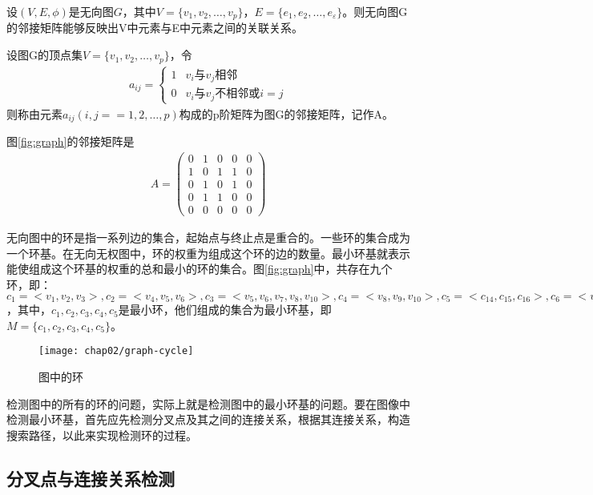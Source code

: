 设$(V, E, \phi)$是无向图$G$，其中$V = \{v_1, v_2, \ldots, v_p\}$，$E = \{e_1, e_2, \ldots, e_\varepsilon\}$。则无向图G的邻接矩阵能够反映出V中元素与E中元素之间的关联关系。
\begin{definition}
设图G的顶点集$V = \{v_1, v_2, \ldots, v_p\}$，令
\begin{align}
a_{ij} = \left\{ \begin{array}{ll}
1 & \textrm{$v_i$与$v_j$相邻}\\
0 & \textrm{$v_i$与$v_j$不相邻或$i = j$}
\end{array} \right.
\end{align}
则称由元素$a_{ij} (i, j == 1, 2, \ldots, p)$构成的p阶矩阵为图G的邻接矩阵\cite{wangzhaorui}，记作A。
\end{definition}
图\ref{fig:graph}的邻接矩阵是
\begin{align}
A = \left( \begin{array}{lllll}
0 & 1 & 0 & 0 & 0 \\
1 & 0 & 1 & 1 & 0 \\
0 & 1 & 0 & 1 & 0 \\
0 & 1 & 1 & 0 & 0 \\
0 & 0 & 0 & 0 & 0 
\end{array} \right)
\end{align}

无向图中的环是指一系列边的集合，起始点与终止点是重合的。一些环的集合成为一个环基。在无向无权图中，环的权重为组成这个环的边的数量。最小环基就表示能使组成这个环基的权重的总和最小的环的集合。图\ref{fig:graph}中，共存在九个环，即：$c_1 = < v_1, v_2, v_3>, c_2 = <v_4, v_5, v_6>, c_3 = <v_5, v_6, v_7, v_8, v_{10}>, c_4 = <v_8, v_9, v_{10}>, c_5 = < c_{14}, c_{15}, c_{16}>, c_6 = <v_{10}, v_{11}, v_{12}, v_{13}>, c_7 = <c_4, c_5, v_{10}, v_9, v_8, v_7, v_6>, c_8 = < v_6, v_5, v_{10}, v_9, v_8, v_7>, v_9 = < v_4, v_5, v_{10}, v_9, v_8, v_7, v_6>$，其中，$c_1, c_2, c_3, c_4, c_5$是最小环，他们组成的集合为最小环基，即$M = \{c_1, c_2, c_3, c_4, c_5\}$。
\begin{figure}[H]
\centering
    \centering
    \texttt{[image: chap02/graph-cycle]}\medskip
\caption{图中的环}
\label{fig:graph-cycle}
\end{figure}


检测图中的所有的环的问题，实际上就是检测图中的最小环基的问题。要在图像中检测最小环基，首先应先检测分叉点及其之间的连接关系，根据其连接关系，构造搜索路径，以此来实现检测环的过程。

\subsection{分叉点与连接关系检测}
\label{}

